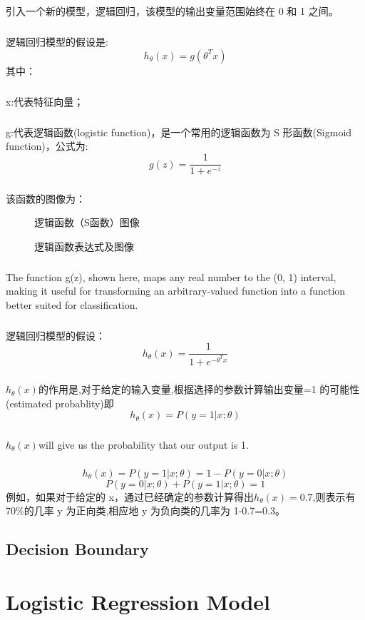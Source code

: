 \documentclass{article}
\begin{document}
\begin{CJK}{UTF8}{gbsn}
\subparagraph{}
引入一个新的模型，逻辑回归，该模型的输出变量范围始终在 0 和 1 之间。
\subparagraph{}
逻辑回归模型的假设是:
\begin{equation}
h_\theta(x)=g(\theta^Tx)
\end{equation}
其中：
\subparagraph{}
x:代表特征向量；
\subparagraph{}
g:代表逻辑函数(logistic function)，是一个常用的逻辑函数为 S 形函数(Sigmoid function)，公式为:
\begin{equation}
g(z)=\frac{1}{1+e^{-z}}
\end{equation}
\subparagraph{}
该函数的图像为：
\begin{figure}[H]
\caption{逻辑函数（S函数）图像}
\label{fig:306}
\end{figure}
\begin{figure}[H]
\caption{逻辑函数表达式及图像}
\label{fig:308}
\end{figure}
\subparagraph{}
The function g(z), shown here, maps any real number to the (0, 1) interval, making it useful for transforming an arbitrary-valued function into a function better suited for classification.
\subparagraph{}
逻辑回归模型的假设：
\begin{equation}
h_\theta(x)=\frac{1}{1+e^{-\theta^Tx}}
\end{equation}
\subparagraph{}
$h_\theta(x)$的作用是,对于给定的输入变量,根据选择的参数计算输出变量=1 的可能性(estimated probablity)即
\begin{equation}
h_\theta(x)=P(y=1|x;\theta)
\end{equation}
\subparagraph{}
$h_\theta(x)$will give us the probability that our output is 1. 
\subparagraph{}
\begin{equation}
h_\theta(x)=P(y=1|x;\theta)=1-P(y=0|x;\theta)
\end{equation}
\begin{equation}
P(y=0|x;\theta)+P(y=1|x;\theta)=1
\end{equation}
例如，如果对于给定的 x，通过已经确定的参数计算得出$h_\theta(x)=0.7$,则表示有 70\%{}的几率 y 为正向类,相应地 y 为负向类的几率为 1-0.7=0.3。
\subsection{Decision Boundary}

\section{Logistic Regression Model}

\end{CJK}
\end{document}
